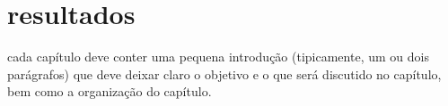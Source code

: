\chapter{resultados}
\label{chap:metodologia}
cada capítulo deve conter uma pequena introdução (tipicamente, um ou dois parágrafos) que deve deixar claro o objetivo e 
o que será discutido no capítulo, bem como a organização do capítulo.
